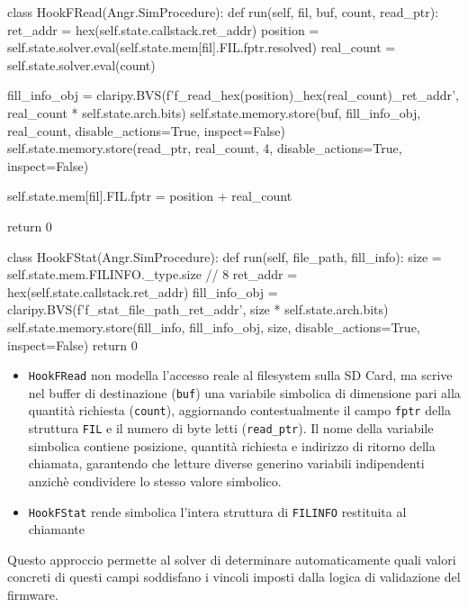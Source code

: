         \begin{pythoncode}[fontsize=\footnotesize]
class HookFRead(Angr.SimProcedure):
    def run(self, fil, buf, count, read_ptr):
        ret_addr = hex(self.state.callstack.ret_addr)
        position = self.state.solver.eval(self.state.mem[fil].FIL.fptr.resolved)
        real_count = self.state.solver.eval(count)
                    
        fill_info_obj = claripy.BVS(f'f_read_{hex(position)}_{hex(real_count)}_{ret_addr}', real_count * self.state.arch.bits)
        self.state.memory.store(buf, fill_info_obj, real_count, disable_actions=True, inspect=False)
        self.state.memory.store(read_ptr, real_count, 4, disable_actions=True, inspect=False)
            
        self.state.mem[fil].FIL.fptr = position + real_count
                        
        return 0 
            
class HookFStat(Angr.SimProcedure):
    def run(self, file_path, fill_info):
        size = self.state.mem.FILINFO._type.size // 8
        ret_addr = hex(self.state.callstack.ret_addr)
        fill_info_obj = claripy.BVS(f'f_stat_{file_path}_{ret_addr}', size * self.state.arch.bits)
        self.state.memory.store(fill_info, fill_info_obj, size, disable_actions=True, inspect=False)            
        return 0
        \end{pythoncode}        

        \begin{itemize}[noitemsep]
            \item \texttt{HookFRead} non modella l'accesso reale al filesystem 
            sulla SD Card, ma scrive nel buffer di destinazione (\texttt{buf}) 
            una variabile simbolica di dimensione pari alla quantità richiesta 
            (\texttt{count}), aggiornando contestualmente il campo \texttt{fptr} 
            della struttura \texttt{FIL} e il numero di byte letti 
            (\texttt{read\_ptr}). Il nome della variabile simbolica contiene 
            posizione, quantità richiesta e indirizzo di ritorno della chiamata, 
            garantendo che letture diverse generino variabili indipendenti 
            anzichè condividere lo stesso valore simbolico.
            \item \texttt{HookFStat} rende simbolica l'intera struttura di \texttt{FILINFO} restituita al chiamante
        \end{itemize}

        Questo approccio permette al solver di determinare automaticamente quali valori concreti di questi campi soddisfano i vincoli imposti dalla logica di validazione del firmware.
        
